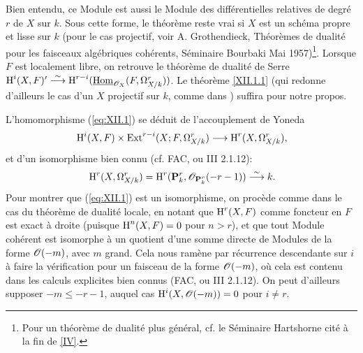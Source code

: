 \begin{remarquestar}
Bien entendu, ce Module est aussi le Module des diff\'erentielles relatives de degr\'e $r$ de $X$ sur $k$. Sous cette forme, le th\'eor\`eme reste vrai si $X$ est un sch\'ema propre et lisse sur $k$ (pour le cas projectif, voir A. Grothendieck, \og Th\'eor\`emes de dualit\'e pour les faisceaux alg\'ebriques coh\'erents\fg, S\'eminaire Bourbaki Mai 1957)\footnote{Pour un th\'eor\`eme de dualit\'e plus g\'en\'eral, cf. le S\'eminaire Hartshorne cit\'e \`a la fin de \Exp \ref{IV}.}. Lorsque $F$ est localement libre, on retrouve le th\'eor\`eme de dualit\'e de Serre $\operatorname{H}^i(X, F)' \overset{\sim}{\longrightarrow} \operatorname{H}^{r-i}(\mathop{\underline{\mathrm{Hom}}}\nolimits_{\mathscr{O}_X}(F, \Omega_{X/k}^r))$. Le th\'eor\`eme \ref{XII.1.1} (qui redonne d'ailleurs le cas d'un $X$ projectif sur $k$, comme dans {\loccit}) suffira pour notre propos.
\end{remarquestar} L'homomorphisme (\ref{eq:XII.1}) se d\'eduit de l'accouplement de Yoneda
\steco
\begin{equation} \label{eq:XII.3} {}\H^i(X, F) \times \Ext^{r-i}(X;F, \omx^r) \to \H^r(X, \omx^r),
\end{equation}
et d'un isomorphisme bien connu (cf. FAC, ou \EGA III 2.1.12):
\steco
\begin{equation} \label{eq:XII.4} {}\operatorname{H}^r(X, \Omega_{X/k}^r) = \operatorname{H}^r({\mathbf P}_k^r, {\mathscr O}_{{\mathbf P}_k^r}(-r-1)) \overset{\sim}{\longrightarrow} k.
\end{equation}
Pour montrer que (\ref{eq:XII.1}) est un isomorphisme, on proc\`ede comme dans le cas du th\'eor\`eme de dualit\'e locale, en notant que $\operatorname{H}^r(X, F)$ comme foncteur en $F$ est exact \`a droite (puisque $\operatorname{H}^n(X, F)=0$ pour $n>r$), et que tout Module coh\'erent est isomorphe \`a un quotient d'une somme directe de Modules de la forme ${\mathscr O}(-m)$, avec $m$ grand. Cela nous ram\`ene par r\'ecurrence descendante sur $i$ \`a faire la v\'erification pour un faisceau de la forme ${\mathscr O}(-m)$, o\`u cela est contenu dans les calculs explicites bien connus (FAC, ou \EGA III 2.1.12). On peut d'ailleurs supposer $-m \leq -r-1$, auquel cas $\operatorname{H}^i(X, {\mathscr O}(-m))=0$ pour $i\neq r$.

